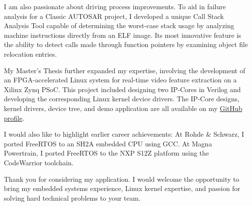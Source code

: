 \documentclass[11pt, a4paper]{awesome-cv}
\begin{document}
\begin{cvletter}
I am also passionate about driving process improvements. To aid in failure analysis for a Classic AUTOSAR project, I developed a unique Call Stack Analysis Tool capable of determining the worst-case stack usage by analyzing machine instructions directly from an ELF image. Its most innovative feature is the ability to detect calls made through function pointers by examining object file relocation entries.

My Master's Thesis further expanded my expertise, involving the development of an FPGA-accelerated Linux system for real-time video feature extraction on a Xilinx Zynq PSoC. This project included designing two IP-Cores in Verilog and developing the corresponding Linux kernel device drivers. The IP-Core designs, kernel drivers, device tree, and demo application are all available on my \href{https://github.com/wafgo}{GitHub profile}.

I would also like to highlight earlier career achievements: At Rohde \& Schwarz, I ported FreeRTOS to an SH2A embedded CPU using GCC. At Magna Powertrain, I ported FreeRTOS to the NXP S12Z platform using the CodeWarrior toolchain.
  
Thank you for considering my application. I would welcome the opportunity to bring my embedded systems experience, Linux kernel expertise, and passion for solving hard technical problems to your team.

\end{cvletter}


\makeletterclosing
\end{document}
